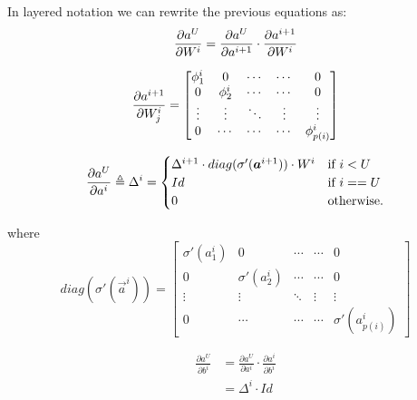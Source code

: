 In layered notation we can rewrite the previous equations as:
\begin{equation}
 \frac{\partial a^U}{\partial W^i} = \frac{\partial a^U}{\partial a^{i+1}} \cdot \frac{\partial a^{i+1}}{\partial W^i}
\end{equation}


\begin{equation}
\frac{\partial a^{i+1}}{\partial W_j^i} =
 \begin{bmatrix}
   \phi_1^{i}    & 0                & \cdots      & \cdots       & 0  \\
   0               & \phi_2^{i}     & \cdots      & \cdots       & 0  \\
   \vdots          & \vdots           & \ddots      & \vdots       &\vdots\\
   0               & \cdots           & \cdots      & \cdots       & \phi^{i}_{p(i)}
\end{bmatrix}
\end{equation}

\begin{equation}
\frac{\partial a^U}{\partial a^{i}} \triangleq \Delta^{i} = 
\begin{cases}
      \Delta^{i+1} \cdot diag(\sigma'(\boldsymbol{a}^{i+1})) \cdot W^{i}  & \text{if } i<U\\
      Id & \text{if } i==U\\
    0 & \text{otherwise}.
\end{cases}
\label{fnn_delta}
\end{equation}

where
\begin{equation}
diag(\sigma'(\vec{a}^{i})) =
 \begin{bmatrix}
   \sigma'(a^{i}_1)    & 0                & \cdots      & \cdots       & 0  \\
   0                     & \sigma'(a^{i}_2)     & \cdots      & \cdots       & 0  \\
   \vdots                & \vdots           & \ddots      & \vdots       &\vdots\\
   0                     & \cdots           & \cdots      & \cdots       &\sigma'(a^{i}_{p(i)})
\end{bmatrix}
\end{equation}

\begin{align}
\frac{\partial a^U}{\partial b^i} &= \frac{\partial a^U}{\partial a^i} \cdot \frac{\partial a^i}{\partial b^i}\\
&= \Delta^{i} \cdot Id
\end{align}


